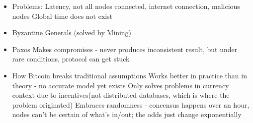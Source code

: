 \documentclass{article}
\begin{document}
\begin{itemize}
  \item Problems:
    \subitem Latency, not all nodes connected, internet connection, malicious nodes
    \subitem Global time does not exist
  \item Byzantine Generals (solved by Mining)
  \item Paxos
    \subitem Makes compromises - never produces inconsistent result, but under rare conditions, protocol can get stuck
  \item How Bitcoin breaks traditional assumptions
    \subitem Works better in practice than in theory - no accurate model yet exists
    \subitem Only solves problems in currency context due to incentives(not distributed databases, which is where the problem originated)
    \subitem Embraces randomness - concensus happens over an hour, nodes can't be certain of what's in/out; the odds just change exponentially
    

\end{itemize}
\end{document}
